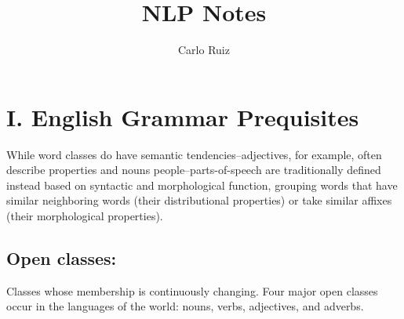 \documentclass[11pt]{article}
\begin{document}
\title{NLP Notes}
\author{Carlo Ruiz }
\maketitle

\section*{I. English Grammar Prequisites}
	While word classes do have semantic tendencies--adjectives, for example, often describe properties 
	and nouns people--parts-of-speech are traditionally defined instead based on syntactic and 
	morphological function, grouping words that have similar neighboring words (their distributional 
	properties) or take similar affixes (their morphological properties). 
	
	\subsection*{Open classes:} Classes whose membership is continuously changing. Four major open classes occur 
	in the languages of the world: nouns, verbs, adjectives, and adverbs.
\end{document}
